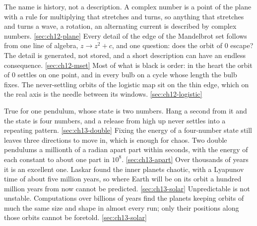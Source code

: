 %
  {The name is history, not a description. A complex number is a point of the plane with a rule for multiplying that stretches and turns, so anything that stretches and turns \dash{} a wave, a rotation, an alternating current \dash{} is described by complex numbers.}%
  {\ref{sec:ch12-plane}}
%
  {Every detail of the edge of the Mandelbrot set follows from one line of algebra, $z \to z^{2} + c$, and one question: does the orbit of $0$ escape? The detail is generated, not stored, and a short description can have an endless consequence.}%
  {\ref{sec:ch12-mset}}
%
  {Most of what is black is order: in the heart the orbit of $0$ settles on one point, and in every bulb on a cycle whose length the bulb fixes. The never-settling orbits of the logistic map sit on the thin edge, which on the real axis is the needle between its windows.}%
  {\ref{sec:ch12-logistic}}

%
  {True for one pendulum, whose state is two numbers. Hang a second from it and the state is four numbers, and a release from high up never settles into a repeating pattern.}%
  {\ref{sec:ch13-double}}
%
  {Fixing the energy of a four-number state still leaves three directions to move in, which is enough for chaos. Two double pendulums a millionth of a radian apart part within seconds, with the energy of each constant to about one part in $10^{8}$.}%
  {\ref{sec:ch13-apart}}
%
  {Over thousands of years it is an excellent one. Laskar found the inner planets chaotic, with a Lyapunov time of about five million years, so where Earth will be on its orbit a hundred million years from now cannot be predicted.}%
  {\ref{sec:ch13-solar}}
%
  {Unpredictable is not unstable. Computations over billions of years find the planets keeping orbits of much the same size and shape in almost every run; only their positions along those orbits cannot be foretold.}%
  {\ref{sec:ch13-solar}}

